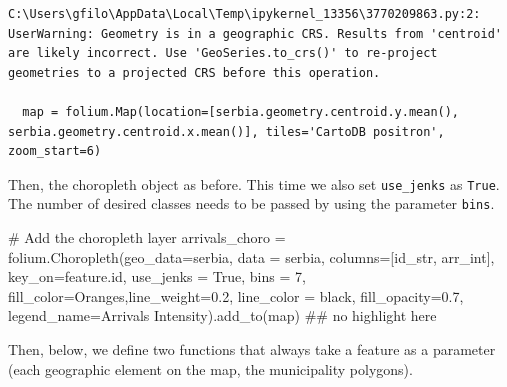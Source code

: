 \documentclass[
  letterpaper,
  DIV=11,
  numbers=noendperiod]{scrreprt}
\newenvironment{Shaded}{\begin{snugshade}}{\end{snugshade}}
\newcommand{\BuiltInTok}[1]{\textcolor[rgb]{0.00,0.23,0.31}{#1}}
\newcommand{\CommentTok}[1]{\textcolor[rgb]{0.37,0.37,0.37}{#1}}
\newcommand{\DecValTok}[1]{\textcolor[rgb]{0.68,0.00,0.00}{#1}}
\newcommand{\FloatTok}[1]{\textcolor[rgb]{0.68,0.00,0.00}{#1}}
\newcommand{\NormalTok}[1]{\textcolor[rgb]{0.00,0.23,0.31}{#1}}
\newcommand{\OperatorTok}[1]{\textcolor[rgb]{0.37,0.37,0.37}{#1}}
\newcommand{\StringTok}[1]{\textcolor[rgb]{0.13,0.47,0.30}{#1}}
\newcommand{\VariableTok}[1]{\textcolor[rgb]{0.07,0.07,0.07}{#1}}
\begin{document}
\begin{verbatim}
C:\Users\gfilo\AppData\Local\Temp\ipykernel_13356\3770209863.py:2: UserWarning: Geometry is in a geographic CRS. Results from 'centroid' are likely incorrect. Use 'GeoSeries.to_crs()' to re-project geometries to a projected CRS before this operation.

  map = folium.Map(location=[serbia.geometry.centroid.y.mean(), serbia.geometry.centroid.x.mean()], tiles='CartoDB positron', zoom_start=6)
\end{verbatim}

Then, the choropleth object as before. This time we also set
\texttt{use\_jenks} as \texttt{True}. The number of desired classes
needs to be passed by using the parameter \texttt{bins}.

\begin{Shaded}
\begin{Highlighting}[]
\CommentTok{\# Add the choropleth layer}
\NormalTok{arrivals\_choro }\OperatorTok{=}\NormalTok{ folium.Choropleth(geo\_data}\OperatorTok{=}\NormalTok{serbia, data }\OperatorTok{=}\NormalTok{ serbia, columns}\OperatorTok{=}\NormalTok{[}\StringTok{\textquotesingle{}id\_str\textquotesingle{}}\NormalTok{, }\StringTok{\textquotesingle{}arr\_int\textquotesingle{}}\NormalTok{], key\_on}\OperatorTok{=}\StringTok{\textquotesingle{}feature.id\textquotesingle{}}\NormalTok{, }
\NormalTok{                                    use\_jenks }\OperatorTok{=} \VariableTok{True}\NormalTok{, bins }\OperatorTok{=} \DecValTok{7}\NormalTok{, fill\_color}\OperatorTok{=}\StringTok{\textquotesingle{}Oranges\textquotesingle{}}\NormalTok{,line\_weight}\OperatorTok{=}\FloatTok{0.2}\NormalTok{, line\_color }\OperatorTok{=} \StringTok{\textquotesingle{}black\textquotesingle{}}\NormalTok{, }
\NormalTok{                                    fill\_opacity}\OperatorTok{=}\FloatTok{0.7}\NormalTok{, legend\_name}\OperatorTok{=}\StringTok{\textquotesingle{}Arrivals Intensity\textquotesingle{}}\NormalTok{).add\_to(}\BuiltInTok{map}\NormalTok{)}
                                    \CommentTok{\#\# no highlight here}
\end{Highlighting}
\end{Shaded}

Then, below, we define two functions that always take a feature as a
parameter (each geographic element on the map, the municipality
polygons).
\end{document}
